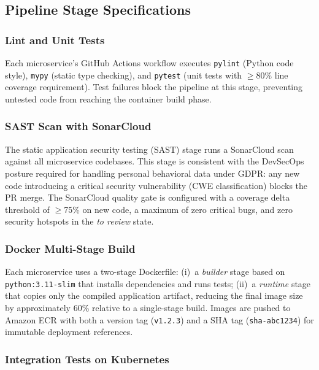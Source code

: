 \documentclass[conference]{IEEEtran}
\begin{document}
\subsection{Pipeline Stage Specifications}

\subsubsection{Lint and Unit Tests}

Each microservice's GitHub Actions workflow executes \texttt{pylint} (Python code style),
\texttt{mypy} (static type checking), and \texttt{pytest} (unit tests with $\geq$80\%
line coverage requirement). Test failures block the pipeline at this stage, preventing
untested code from reaching the container build phase.

\subsubsection{SAST Scan with SonarCloud}

The static application security testing (SAST) stage runs a SonarCloud scan against all
microservice codebases. This stage is consistent with the DevSecOps posture required for
handling personal behavioral data under GDPR: any new code introducing a critical
security vulnerability (CWE classification) blocks the PR merge. The SonarCloud quality
gate is configured with a coverage delta threshold of $\geq$75\% on new code, a maximum
of zero critical bugs, and zero security hotspots in the \textit{to review} state.

\subsubsection{Docker Multi-Stage Build}

Each microservice uses a two-stage Dockerfile: (i)~a \textit{builder} stage based on
\texttt{python:3.11-slim} that installs dependencies and runs tests; (ii)~a
\textit{runtime} stage that copies only the compiled application artifact, reducing the
final image size by approximately 60\% relative to a single-stage build. Images are
pushed to Amazon ECR with both a version tag (\texttt{v1.2.3}) and a SHA tag
(\texttt{sha-abc1234}) for immutable deployment references.

\subsubsection{Integration Tests on Kubernetes}
\end{document}
